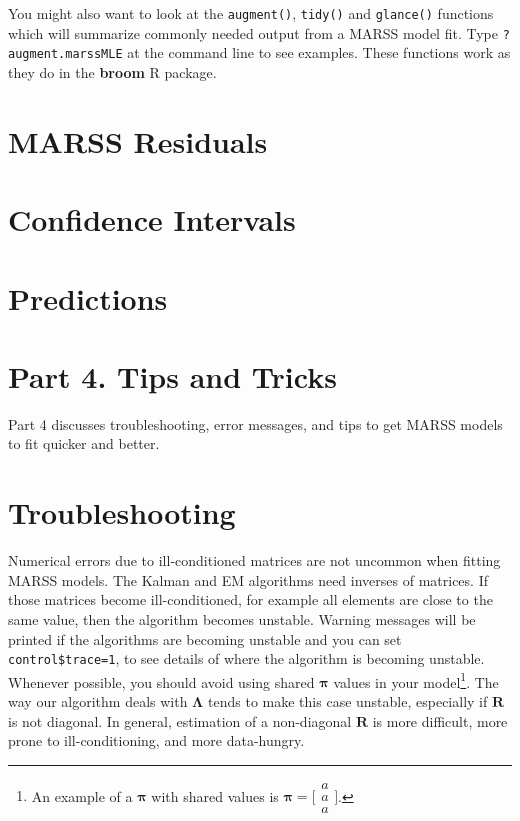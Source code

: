 \documentclass[12pt,]{book}
\let\rmarkdownfootnote\footnote%
\def\footnote{\protect\rmarkdownfootnote}
\begin{document}
You might also want to look at the \texttt{augment()}, \texttt{tidy()} and \texttt{glance()} functions which will summarize commonly needed output from a MARSS model fit. Type \texttt{?augment.marssMLE} at the command line to see examples. These functions work as they do in the \textbf{broom} R package.

\hypertarget{marss-residuals}{%
\chapter{MARSS Residuals}\label{marss-residuals}}

\hypertarget{confidence-intervals}{%
\chapter{Confidence Intervals}\label{confidence-intervals}}

\hypertarget{predictions}{%
\chapter{Predictions}\label{predictions}}

\hypertarget{part4}{%
\chapter*{Part 4. Tips and Tricks}\label{part4}}


Part 4 discusses troubleshooting, error messages, and tips to get MARSS models to fit quicker and better.

\hypertarget{troubleshooting}{%
\chapter{Troubleshooting}\label{troubleshooting}}

Numerical errors due to ill-conditioned matrices are not uncommon when fitting MARSS models. The Kalman and EM algorithms need inverses of matrices. If those matrices become ill-conditioned, for example all elements are close to the same value, then the algorithm becomes unstable. Warning messages will be printed if the algorithms are becoming unstable and you can set \texttt{control\$trace=1}, to see details of where the algorithm is becoming unstable. Whenever possible, you should avoid using shared \(\boldsymbol{\pi}\) values in your model\footnote{An example of a $\boldsymbol{\pi}$ with shared values is $\boldsymbol{\pi}=\bigl[\begin{smallmatrix} a\\a\\a \end{smallmatrix} \bigr]$.}. The way our algorithm deals with \(\boldsymbol{\Lambda}\) tends to make this case unstable, especially if \(\mathbf{R}\) is not diagonal. In general, estimation of a non-diagonal \(\mathbf{R}\) is more difficult, more prone to ill-conditioning, and more data-hungry.
\end{document}
